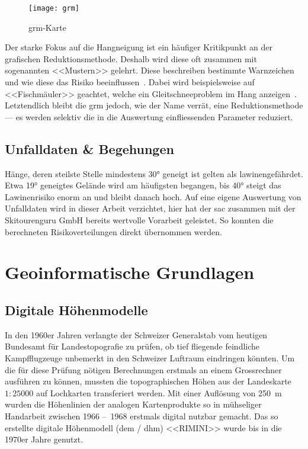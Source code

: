 \begin{figure}[H]
  \centering
  \texttt{[image: grm]}
  \caption{\gls{grm}-Karte~\cite{achtunglawine}}\label{fig:grm}
\end{figure}

Der starke Fokus auf die Hangneigung ist ein häufiger Kritikpunkt an der grafischen Reduktionsmethode. Deshalb wird diese oft zusammen mit sogenannten <<Mustern>> gelehrt. Diese beschreiben bestimmte Warnzeichen und wie diese das Risiko beeinflussen~\cite{achtunglawine}. Dabei wird beispielsweise auf <<Fischmäuler>> geachtet, welche ein Gleitschneeproblem im Hang anzeigen~\cite{harveyrhynerschweizerlawinenkunde}. Letztendlich bleibt die \gls{grm} jedoch, wie der Name verrät, eine Reduktionsmethode --- es werden selektiv die in die Auswertung einfliessenden Parameter reduziert.

\subsection{Unfalldaten \& Begehungen}

Hänge, deren steilste Stelle mindestens 30° geneigt ist gelten als lawinengefährdet. Etwa 19° geneigtes Gelände wird am häufigsten begangen, bis 40° steigt das Lawinenrisiko enorm an und bleibt danach hoch. Auf eine eigene Auswertung von Unfalldaten wird in dieser Arbeit verzichtet, hier hat der \acrfull{sac} zusammen mit der Skitourenguru GmbH bereits wertvolle Vorarbeit geleistet. So konnten die berechneten Risikoverteilungen direkt übernommen werden.~\cite{sacbergspwinterp99} 


\clearpage
\section{Geoinformatische Grundlagen}

\subsection{Digitale Höhenmodelle}\label{sec:dem}

In den 1960er Jahren verlangte der Schweizer Generalstab vom heutigen Bundesamt für Landestopografie zu prüfen, ob tief fliegende feindliche Kampfflugzeuge unbemerkt in den Schweizer Luftraum eindringen könnten. Um die für diese Prüfung nötigen Berechnungen erstmals an einem Grossrechner ausführen zu können, mussten die topographischen Höhen aus der Landeskarte $1:25000$ auf Lochkarten transferiert werden. Mit einer Auflösung von \qty{250}{m} wurden die Höhenlinien der analogen Kartenprodukte so in mühseliger Handarbeit zwischen 1966 --~1968 erstmals digital nutzbar gemacht. Das so erstellte digitale Höhenmodell (\acrshort{dem} / \acrshort{dhm}) <<RIMINI>> wurde bis in die 1970er Jahre genutzt.~\cite{swisstopohistdem}

